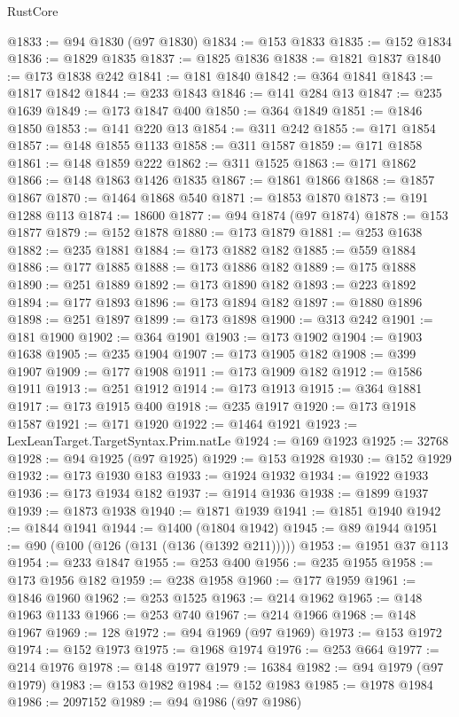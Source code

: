 \begin{lexlean}{RustCore}
\begin{coremodule}
@1833 := @94 @1830 (@97 @1830)
@1834 := @153 @1833
@1835 := @152 @1834
@1836 := @1829 @1835
@1837 := @1825 @1836
@1838 := @1821 @1837
@1840 := @173 @1838 @242
@1841 := @181 @1840
@1842 := @364 @1841
@1843 := @1817 @1842
@1844 := @233 @1843
@1846 := @141 @284 @13
@1847 := @235 @1639
@1849 := @173 @1847 @400
@1850 := @364 @1849
@1851 := @1846 @1850
@1853 := @141 @220 @13
@1854 := @311 @242
@1855 := @171 @1854
@1857 := @148 @1855 @1133
@1858 := @311 @1587
@1859 := @171 @1858
@1861 := @148 @1859 @222
@1862 := @311 @1525
@1863 := @171 @1862
@1866 := @148 @1863 @1426 @1835
@1867 := @1861 @1866
@1868 := @1857 @1867
@1870 := @1464 @1868 @540
@1871 := @1853 @1870
@1873 := @191 @1288 @113
@1874 := 18600
@1877 := @94 @1874 (@97 @1874)
@1878 := @153 @1877
@1879 := @152 @1878
@1880 := @173 @1879
@1881 := @253 @1638
@1882 := @235 @1881
@1884 := @173 @1882 @182
@1885 := @559 @1884
@1886 := @177 @1885
@1888 := @173 @1886 @182
@1889 := @175 @1888
@1890 := @251 @1889
@1892 := @173 @1890 @182
@1893 := @223 @1892
@1894 := @177 @1893
@1896 := @173 @1894 @182
@1897 := @1880 @1896
@1898 := @251 @1897
@1899 := @173 @1898
@1900 := @313 @242
@1901 := @181 @1900
@1902 := @364 @1901
@1903 := @173 @1902
@1904 := @1903 @1638
@1905 := @235 @1904
@1907 := @173 @1905 @182
@1908 := @399 @1907
@1909 := @177 @1908
@1911 := @173 @1909 @182
@1912 := @1586 @1911
@1913 := @251 @1912
@1914 := @173 @1913
@1915 := @364 @1881
@1917 := @173 @1915 @400
@1918 := @235 @1917
@1920 := @173 @1918 @1587
@1921 := @171 @1920
@1922 := @1464 @1921
@1923 := LexLeanTarget.TargetSyntax.Prim.natLe
@1924 := @169 @1923
@1925 := 32768
@1928 := @94 @1925 (@97 @1925)
@1929 := @153 @1928
@1930 := @152 @1929
@1932 := @173 @1930 @183
@1933 := @1924 @1932
@1934 := @1922 @1933
@1936 := @173 @1934 @182
@1937 := @1914 @1936
@1938 := @1899 @1937
@1939 := @1873 @1938
@1940 := @1871 @1939
@1941 := @1851 @1940
@1942 := @1844 @1941
@1944 := @1400 (@1804 @1942)
@1945 := @89 @1944
@1951 := @90 (@100 (@126 (@131 (@136 (@1392 @211)))))
@1953 := @1951 @37 @113
@1954 := @233 @1847
@1955 := @253 @400
@1956 := @235 @1955
@1958 := @173 @1956 @182
@1959 := @238 @1958
@1960 := @177 @1959
@1961 := @1846 @1960
@1962 := @253 @1525
@1963 := @214 @1962
@1965 := @148 @1963 @1133
@1966 := @253 @740
@1967 := @214 @1966
@1968 := @148 @1967
@1969 := 128
@1972 := @94 @1969 (@97 @1969)
@1973 := @153 @1972
@1974 := @152 @1973
@1975 := @1968 @1974
@1976 := @253 @664
@1977 := @214 @1976
@1978 := @148 @1977
@1979 := 16384
@1982 := @94 @1979 (@97 @1979)
@1983 := @153 @1982
@1984 := @152 @1983
@1985 := @1978 @1984
@1986 := 2097152
@1989 := @94 @1986 (@97 @1986)

\end{coremodule}
\end{lexlean}
